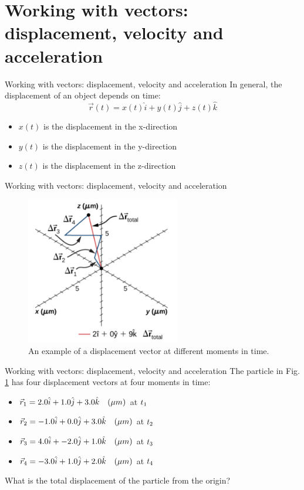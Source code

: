 \documentclass{beamer}
\begin{document}
\section{Working with vectors: displacement, velocity and acceleration}

\begin{frame}{Working with vectors: displacement, velocity and acceleration}
In general, the displacement of an object depends on time:
\begin{equation}
\vec{r}(t) = x(t) \hat{i} + y(t) \hat{j} + z(t) \hat{k}
\end{equation}
\begin{itemize}
\item $x(t)$ is the displacement in the x-direction
\item $y(t)$ is the displacement in the y-direction
\item $z(t)$ is the displacement in the z-direction
\end{itemize}
\end{frame}

\begin{frame}{Working with vectors: displacement, velocity and acceleration}
\begin{figure}
\centering
\includegraphics[width=0.6\textwidth,trim=0cm 2cm 0cm 0cm,clip=true]{figures/Brownian.png}
\caption{\label{fig:brown} An example of a displacement vector at different moments in time.}
\end{figure}
\end{frame}

\begin{frame}{Working with vectors: displacement, velocity and acceleration}
The particle in Fig. \ref{fig:brown} has four displacement vectors at four moments in time:
\begin{itemize}
\item $\vec{r}_{\rm 1} = 2.0\hat{i} + 1.0\hat{j} + 3.0\hat{k}\quad(\mu m)$ at $t_{\rm 1}$
\item $\vec{r}_{\rm 2} = -1.0\hat{i} + 0.0\hat{j} + 3.0\hat{k}\quad(\mu m)$ at $t_{\rm 2}$
\item $\vec{r}_{\rm 3} = 4.0\hat{i} + -2.0\hat{j} + 1.0\hat{k}\quad(\mu m)$ at $t_{\rm 3}$
\item $\vec{r}_{\rm 4} = -3.0\hat{i} + 1.0\hat{j} + 2.0\hat{k}\quad(\mu m)$ at $t_{\rm 4}$
\end{itemize}
What is the total displacement of the particle from the origin?
\end{frame}
\end{document}
